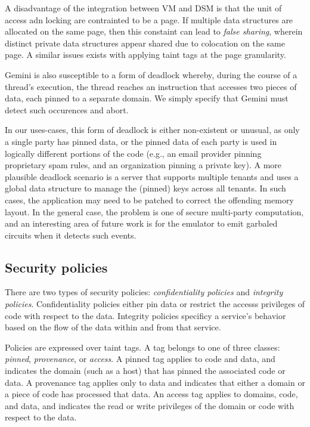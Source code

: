 %
A disadvantage of the integration between VM and DSM is that the unit of access
adn locking are contrainted to be a page.
%
If multiple data structures are allocated on the same page, then this constaint
can lead to \emph{false sharing}, wherein distinct private data structures
appear shared due to colocation on the same page.
%
A similar issues exists with applying taint tags at the page granularity.


Gemini is also susceptible to a form of deadlock whereby, during the course of
a thread's execution, the thread reaches an instruction that accesses two
pieces of data, each pinned to a separate domain.
%
We simply specify that Gemini must detect such occurences and abort.


In our uses-cases, this form of deadlock is either non-existent or unusual, as
only a single party has pinned data, or the pinned data of each party is used 
in logically different portions of the code (e.g., an email provider pinning
proprietary spam rules, and an organization pinning a private key).
%
A more plausible deadlock scenario is a server that supports multiple tenants
and uses a global data structure to manage the (pinned) keys across all
tenants.
%
In such cases, the application may need to be patched to correct the offending
memory layout.
%
In the general case, the problem is one of secure multi-party computation, and
an interesting area of future work is for the emulator to emit garbaled
circuits when it detects such events.


\subsection{Security policies}
%
There are two types of security policies: \emph{confidentiality policies} and
\emph{integrity policies}.
%
Confidentiality policies either pin data or restrict the accesss privileges of
code with respect to the data.
%
Integrity policies specificy a service's behavior
based on the flow of the data within and from that service. 


Policies are expressed over taint tags.
%
A tag belongs to one of three classes: \emph{pinned}, \emph{provenance},
or \emph{access}.
%
A pinned tag applies to code and data, and indicates the domain (such
as a host) that has pinned the associated code or data.
%
A provenance tag applies only to data and indicates that either a domain or a piece of
code has processed that data.
%
An access tag applies to domains, code, and data, and indicates the read or
write privileges of the domain or code with respect to the data.


